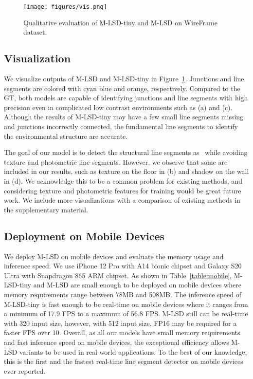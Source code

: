 \documentclass[letterpaper]{article} \usepackage{aaai22}  \usepackage{times}  \usepackage{helvet}  \usepackage{courier}  \usepackage[hyphens]{url}  \usepackage{graphicx} \urlstyle{rm} \def\UrlFont{\rm}  \usepackage{natbib}  \usepackage{caption} \DeclareCaptionStyle{ruled}{labelfont=normalfont,labelsep=colon,strut=off} \frenchspacing  \setlength{\pdfpagewidth}{8.5in}  \setlength{\pdfpageheight}{11in}  \usepackage{algorithm}
\begin{document}
\begin{figure}[t!]
\centering
\texttt{[image: figures/vis.png]}
\caption{Qualitative evaluation of M-LSD-tiny and M-LSD on WireFrame dataset.}
\label{fig:vis}
\end{figure}


\subsection{Visualization}
We visualize outputs of M-LSD and M-LSD-tiny in Figure~\ref{fig:vis}.
Junctions and line segments are colored with cyan blue and orange, respectively.
Compared to the GT, both models are capable of identifying junctions and line segments with high precision even in complicated low contrast environments such as (a) and (c).
Although the results of M-LSD-tiny may have a few small line segments missing and junctions incorrectly connected, the fundamental line segments to identify the environmental structure are accurate.

The goal of our model is to detect the structural line segments as~\cite{huang2018learning} while avoiding texture and photometric line segments.
However, we observe that some are included in our results, such as texture on the floor in (b) and shadow on the wall in (d).
We acknowledge this to be a common problem for existing methods, and considering texture and photometric features for training would be great future work.
We include more visualizations with a comparison of existing methods in the supplementary material.


\subsection{Deployment on Mobile Devices}
We deploy M-LSD on mobile devices and evaluate the memory usage and inference speed.
We use iPhone 12 Pro with A14 bionic chipset and Galaxy S20 Ultra with Snapdragon 865 ARM chipset.
As shown in Table~\ref{table:mobile}, M-LSD-tiny and M-LSD are small enough to be deployed on mobile devices where memory requirements range between 78MB and 508MB.
The inference speed of M-LSD-tiny is fast enough to be real-time on mobile devices where it ranges from a minimum of 17.9 FPS to a maximum of 56.8 FPS.
M-LSD still can be real-time with 320 input size, however, with 512 input size, FP16 may be required for a faster FPS over 10.
Overall, as all our models have small memory requirements and fast inference speed on mobile devices, the exceptional efficiency allows M-LSD variants to be used in real-world applications.
To the best of our knowledge, this is the first and the fastest real-time line segment detector on mobile devices ever reported.
\end{document}
